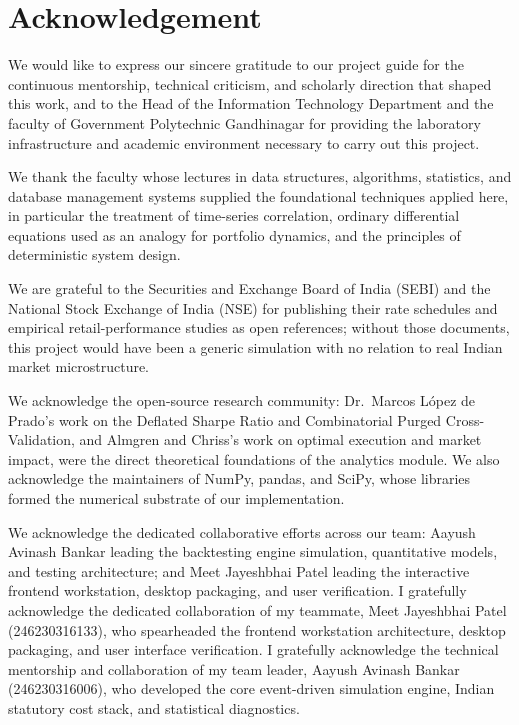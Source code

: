 \documentclass[12pt,a4paper,oneside]{report}
\newcommand{\copyMode}{0}
\begin{document}
\chapter*{Acknowledgement}
\thispagestyle{plain}

\vspace{0.8cm}

We would like to express our sincere gratitude to our project guide for the
continuous mentorship, technical criticism, and scholarly direction that shaped
this work, and to the Head of the Information Technology Department and the faculty
of Government Polytechnic Gandhinagar for providing the laboratory infrastructure
and academic environment necessary to carry out this project.

We thank the faculty whose lectures in data structures, algorithms, statistics,
and database management systems supplied the foundational techniques applied here,
in particular the treatment of time-series correlation, ordinary differential
equations used as an analogy for portfolio dynamics, and the principles of
deterministic system design.

We are grateful to the Securities and Exchange Board of India (SEBI) and the
National Stock Exchange of India (NSE) for publishing their rate schedules and
empirical retail-performance studies as open references; without those documents,
this project would have been a generic simulation with no relation to real Indian
market microstructure.

We acknowledge the open-source research community: Dr.\ Marcos López de Prado's
work on the Deflated Sharpe Ratio and Combinatorial Purged Cross-Validation, and
Almgren and Chriss's work on optimal execution and market impact, were the direct
theoretical foundations of the analytics module. We also acknowledge the
maintainers of NumPy, pandas, and SciPy, whose libraries formed the numerical
substrate of our implementation.

\ifcase\copyMode
We acknowledge the dedicated collaborative efforts across our team: Aayush Avinash Bankar leading the backtesting engine simulation, quantitative models, and testing architecture; and Meet Jayeshbhai Patel leading the interactive frontend workstation, desktop packaging, and user verification.
\or
I gratefully acknowledge the dedicated collaboration of my teammate, Meet Jayeshbhai Patel (246230316133), who spearheaded the frontend workstation architecture, desktop packaging, and user interface verification.
\or
I gratefully acknowledge the technical mentorship and collaboration of my team leader, Aayush Avinash Bankar (246230316006), who developed the core event-driven simulation engine, Indian statutory cost stack, and statistical diagnostics.
\fi
\end{document}
